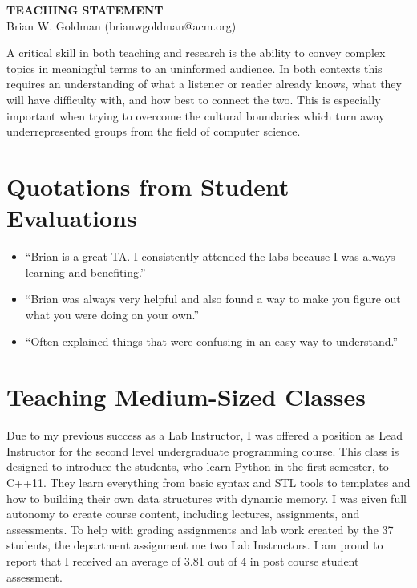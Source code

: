 \documentclass[a4paper, 11pt]{article}
\begin{document}
\thispagestyle{empty}

\pagestyle{fancy}

\begin{center}
{\LARGE \bf TEACHING STATEMENT}\\
\vspace*{0.1cm}
{\normalsize Brian W. Goldman (brianwgoldman@acm.org)}
\end{center}

\noindent
A critical skill in both teaching and research is the ability to convey
complex topics in meaningful terms to an uninformed audience. In both
contexts this requires an understanding of what a listener or reader
already knows, what they will have difficulty with, and how best to
connect the two. This is especially important when trying to overcome
the cultural boundaries which turn away underrepresented groups from
the field of computer science.

\section{Quotations from Student Evaluations}
\begin{itemize}
\item ``Brian is a great TA. I consistently attended the labs because I was always learning and benefiting.''
\item ``Brian was always very helpful and also found a way to make you figure out what you were doing on your own.''
\item ``Often explained things that were confusing in an easy way to understand.''
\end{itemize}

\section{Teaching Medium-Sized Classes}
Due to my previous success as a Lab Instructor, I was offered a
position as Lead Instructor for the second level undergraduate
programming course. This class is designed to introduce the students,
who learn Python in the first semester, to C++11. They learn
everything from basic syntax and STL tools to templates and how
to building their own data structures with dynamic memory.
I was given full autonomy to create course content, including
lectures, assignments, and assessments. To help with grading
assignments and lab work created by the 37 students, the
department assignment me two Lab Instructors.
I am proud to report that I received an average
of 3.81 out of 4 in post course student assessment.
\end{document}
